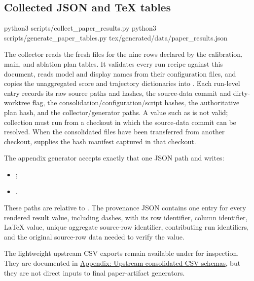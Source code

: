 \documentclass[11pt]{article}
\begin{document}
\subsection{Collected JSON and TeX tables}
\begin{DocCode}
python3 scripts/collect_paper_results.py
python3 scripts/generate_paper_tables.py tex/generated/data/paper_results.json
\end{DocCode}
The collector reads the fresh  files for the nine rows declared by the calibration, main, and ablation plan tables. It validates every run recipe against this document, reads model and \termSimulator display names from their configuration files, and copies the unaggregated score and trajectory dictionaries into . Each run-level entry records its raw source paths and hashes, the source-data commit and dirty-worktree flag, the consolidation/configuration/script hashes, the authoritative plan hash, and the collector/generator paths. A value such as  is not valid; collection must run from a checkout in which the source-data commit can be resolved. When the consolidated files have been transferred from another checkout,  supplies the hash manifest captured in that checkout.

The appendix generator accepts exactly that one JSON path and writes:
\begin{itemize}
  \item {};
  \item {}.
\end{itemize}
These paths are relative to . The provenance JSON contains one entry for every rendered result value, including dashes, with its row identifier, column identifier, LaTeX value, unique aggregate source-row identifier, contributing run identifiers, and the original source-row data needed to verify the value.

The lightweight upstream CSV exports remain available under  for inspection. They are documented in \hyperref[sec:experiment-plan-consolidated-csv-schema-appendix]{Appendix: Upstream consolidated CSV schemas}, but they are not direct inputs to final paper-artifact generators.
\end{document}
